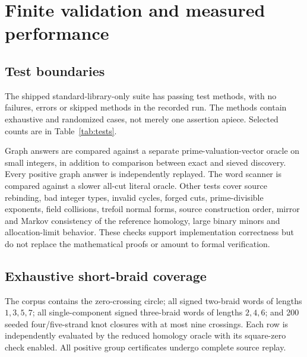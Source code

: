 \documentclass[11pt]{article}
\theoremstyle{definition}\newtheorem{definition}[theorem]{Definition}
\theoremstyle{remark}\newtheorem{remark}[theorem]{Remark}
\newcommand{\code}[1]{\texttt{#1}}
\begin{document}
\section{Finite validation and measured performance}
\label{sec:measurements}
\subsection{Test boundaries}
The shipped standard-library-only suite has \TestCount{} passing test
methods, with no failures, errors or skipped methods in the recorded run.
The methods contain exhaustive and randomized cases, not merely one
assertion apiece. Selected counts are in Table~\ref{tab:tests}.
\begin{table}[htbp]\centering

\caption{Selected inner-test counts from \code{test\_summary.json}.}
\label{tab:tests}\end{table}
Graph answers are compared against a separate prime-valuation-vector
oracle on small integers, in addition to comparison between exact and
sieved discovery. Every positive graph answer is independently replayed.
The word scanner is compared against a slower all-cut literal oracle.
Other tests cover source rebinding, bad integer types, invalid cycles,
forged cuts, prime-divisible exponents, field collisions, trefoil normal
forms, source construction order, mirror and Markov consistency of the
reference homology, large binary minors and allocation-limit behavior.
These checks support implementation correctness but do not replace the
mathematical proofs or amount to formal verification.

\subsection{Exhaustive short-braid coverage}
\begin{table}[htbp]\centering\small

\caption{Independent small-braid audit. ``New'' means positive coverage beyond
pure-power-only deletion in the same difference basis, not beyond the
maintained recognizer. Inputs are word presentations, not distinct knot types.}
\label{tab:audit}\end{table}
The corpus contains the zero-crossing circle; all signed two-braid words
of lengths $1,3,5,7$; all single-component signed three-braid words of
lengths $2,4,6$; and 200 seeded four/five-strand knot closures with at most
nine crossings. Each row is independently evaluated by the reduced
homology oracle with its square-zero check enabled. All positive group
certificates undergo complete source replay.
\end{document}
